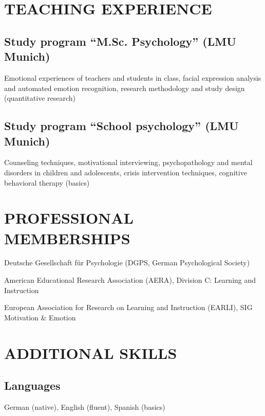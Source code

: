 \documentclass[letterpaper]{article}
\renewenvironment{itemize}{ %
  \begin{list}{}{ %
    \setlength{\leftmargin}{2.5em} %
  }
}{
  \end{list}
}
\begin{document}
\section*{TEACHING EXPERIENCE}
\subsection*{Study program “M.Sc. Psychology” (LMU Munich)}
\begin{itemize}
\item Emotional experiences of teachers and students in class, facial expression analysis and automated emotion recognition, research methodology and study design (quantitative research)
\end{itemize}

\subsection*{Study program “School psychology” (LMU Munich)}
\begin{itemize}
\item Counseling techniques, motivational interviewing, psychopathology and mental disorders in children and adolescents, crisis intervention techniques, cognitive behavioral therapy (basics)
\end{itemize}


\section*{PROFESSIONAL MEMBERSHIPS}
\begin{itemize}
\item[$\ast$] Deutsche Gesellschaft für Psychologie (DGPS, German Psychological Society)
\item[$\ast$] American Educational Research Association (AERA), Division C: Learning and Instruction
\item[$\ast$] European Association for Research on Learning and Instruction (EARLI), SIG Motivation \& Emotion
\end{itemize}


\section*{ADDITIONAL SKILLS}
\subsection*{Languages}
\begin{itemize}
\item German (native), English (fluent), Spanish (basics)
\end{itemize}
\end{document}
